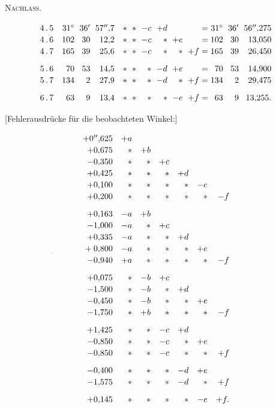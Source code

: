 \begingroup
\clearpage
{}\hfill\textsc{Nachlass.}\hfill\mbox{}\par\medskip
\[
\setlength{\arraycolsep}{3pt}
\begin{array}{c@{\quad}rrr@{\quad}rrrrrr@{\;}c@{\;}rrr}
4\,.\,5&31^\circ&36'&57''{,}7&\ast&\ast&-c&+d&&&=&31^\circ&36'&56''{,}275\\
4\,.\,6&102&30&12{,}2&\ast&\ast&-c&\ast&+e&&=&102&30&13{,}050\\
4\,.\,7&165&39&25{,}6&\ast&\ast&-c&\ast&\ast&+f&=&165&39&26{,}450\\[7pt]
5\,.\,6&70&53&14{,}5&\ast&\ast&\ast&-d&+e&&=&70&53&14{,}900\\
5\,.\,7&134&2&27{,}9&\ast&\ast&\ast&-d&\ast&+f&=&134&2&29{,}475\\[7pt]
6\,.\,7&63&9&13{,}4&\ast&\ast&\ast&\ast&-e&+f&=&63&9&13{,}255.
\end{array}
\]
\begin{center}[Fehlerausdrücke für die beobachteten Winkel:]\end{center}
\[
\renewcommand{\arraystretch}{1.15}
\begin{array}{rrrrrrr}
+0''{,}625&+a&&&&&\\
+0{,}675&\ast&+b&&&&\\
-0{,}350&\ast&\ast&+c&&&\\
+0{,}425&\ast&\ast&\ast&+d&&\\
+0{,}100&\ast&\ast&\ast&\ast&-e&\\
+0{,}200&\ast&\ast&\ast&\ast&\ast&-f\\[7pt]
+0{,}163&-a&+b&&&&\\
-1{,}000&-a&\ast&+c&&&\\
+0{,}335&-a&\ast&\ast&+d&&\\
\llap{\raisebox{-.6ex}{\text{\tiny.}}\hspace{1.3cm}}+0{,}800&-a&\ast&\ast&\ast&+e&\\
-0{,}940&+a&\ast&\ast&\ast&\ast&-f\\[7pt]
+0{,}075&\ast&-b&+c&&&\\
-1{,}500&\ast&-b&\ast&+d&&\\
-0{,}450&\ast&-b&\ast&\ast&+e&\\
-1{,}750&\ast&+b&\ast&\ast&\ast&-f\\[7pt]
+1{,}425&\ast&\ast&-c&+d&&\\
-0{,}850&\ast&\ast&-c&\ast&+e&\\
-0{,}850&\ast&\ast&-c&\ast&\ast&+f\\[7pt]
-0{,}400&\ast&\ast&\ast&-d&+e&\\
-1{,}575&\ast&\ast&\ast&-d&\ast&+f\\[7pt]
+0{,}145&\ast&\ast&\ast&\ast&-e&+f.
\end{array}
\]

